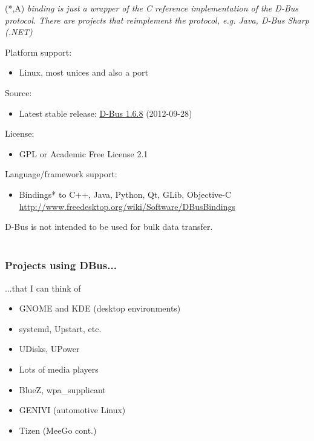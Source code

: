 \documentclass[xcolor=dvipsnames,compress]{beamer}
\newenvironment{reference}[2]{%
    \begin{textblock*}{\textwidth}(#1,#2) 
    \tiny\it\bgroup\color{blue}}{\egroup\end{textblock*}}
\begin{document}
\begin{frame}
    \begin{reference}{4mm}{85mm}
    * A binding is just a wrapper of the C reference implementation of the D-Bus protocol. There are projects that reimplement the protocol, e.g. Java, D-Bus Sharp (.NET)
    \end{reference}
    Platform support:
    \begin{itemize}
    \item Linux, most unices and also a  port
    \end{itemize}
    Source:
    \begin{itemize}
    \item Latest stable release: \href{http://dbus.freedesktop.org/releases/dbus/dbus-1.6.8.tar.gz}{D-Bus 1.6.8} (2012-09-28)
    \end{itemize}
    License:
    \begin{itemize}
    \item GPL or Academic Free License 2.1
    \end{itemize}
    Language/framework support:
    \begin{itemize}
    \item Bindings* to C++, Java, Python, Qt, GLib, Objective-C\\
    \href{http://www.freedesktop.org/wiki/Software/DBusBindings}
    {http://www.freedesktop.org/wiki/Software/DBusBindings}
    \end{itemize}
\end{frame}

\begin{frame}
    D-Bus is not intended to be used for bulk data transfer.\\~\\
\end{frame}

\begin{frame}[fragile]
    \frametitle{Projects using DBus...}
    ...that I can think of
    \begin{itemize}
    \item GNOME and KDE (desktop environments)
    \item systemd, Upstart, etc.
    \item UDisks, UPower
    \item Lots of media players
    \item BlueZ, wpa\_supplicant
    \item GENIVI (automotive Linux)
    \item Tizen (MeeGo cont.)
    \end{itemize}
\end{frame}
\end{document}
